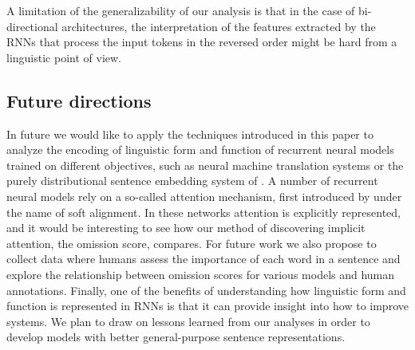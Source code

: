 
A limitation of the generalizability of our 
analysis is that in the case of 
bi-directional architectures, the interpretation of the features
extracted by the RNNs that process the input tokens in the reversed order
might be hard from a linguistic point of view. 

\subsection{Future directions}

In future we would like to apply the techniques introduced in this paper 
to analyze the encoding of linguistic form and function of 
recurrent neural models trained on different objectives, 
such as neural machine translation systems
\cite{sutskever2014sequence} or the purely distributional
sentence embedding system of . A number of
recurrent neural models rely on a so-called attention mechanism, first
introduced by  under the name of soft
alignment. In these networks attention is explicitly represented, and it
would be interesting to see how our method of discovering implicit
attention, the omission score, compares. For future work we also propose to
collect data where humans assess the importance of each word in a sentence
and explore the relationship between omission scores for various models
and human annotations.\label{edit:humanjudgement} Finally, one of the benefits
of understanding how linguistic form and function is represented in RNNs is that
it can provide insight into how to improve systems. We plan to draw on
lessons learned from our analyses in order to develop models with better 
general-purpose sentence representations.




